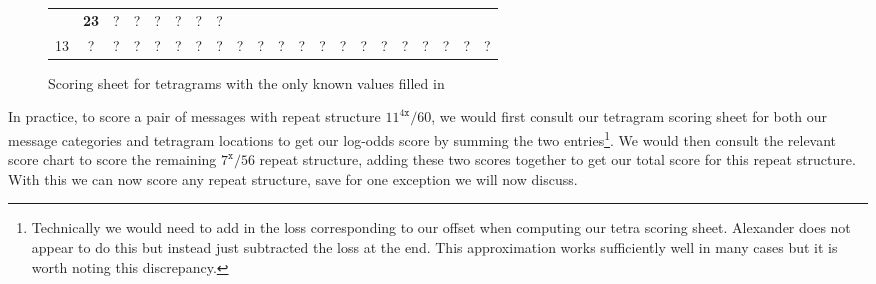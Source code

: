 \begin{figure}[H]
\begin{center}
{\begin{tabular}{|c|*{20}{c|}}
          & {\bf{23}}      & ?            & ?             & ?
          & ?              & ?            & ?                             \\
          13            & ?              & ?            & ?             & ?
          & ?              & ?            & ?             & ?           &
          ?             & ?              & ?            & ?             & ?
          & ?              & ?            & ?             & ?
          & ?              & ?            & ?                             \\
          \hline
      \end{tabular}}
    \end{center}
    \caption{Scoring sheet for tetragrams with the only known values filled in}
  \end{figure}
  \noindent In practice, to score a pair of messages with repeat structure
  $11^{4\texttt{x}}/60$, we would first consult our tetragram scoring
  sheet for both our message categories and tetragram locations to get our
  log-odds score by summing the two entries\footnote{Technically we
    would need to add in the loss corresponding to our offset when
    computing our tetra scoring sheet. Alexander does not appear to do
    this but instead just subtracted the loss at the end. This
    approximation works sufficiently well in many cases but it is worth
  noting this discrepancy. }. We would then consult the relevant
  score chart to score
  the remaining $7^\texttt{x}/56$ repeat structure, adding these two
  scores together to get our total score for this repeat structure.
  With this we can now score any repeat structure, save for one
  exception we will now discuss.

